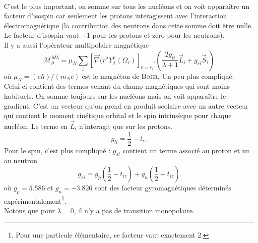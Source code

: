 \ \\

C'est le plus important, on somme sur tous les nucléons et on voit apparaître un facteur d'isospin car 
seulement les protons interagissent avec l'interaction électromagnétique (la contribution des neutrons dans
cette somme doit être nulle. Le facteur d'isospin vaut +1 pour les protons et zéro pour les neutrons).\ \\

Il y a aussi l'opérateur multipolaire magnétique
\begin{equation}
\mathcal{M}_\mu^{M\lambda} = \mu_N\sum_i[\vec\nabla(r^\lambda Y_\lambda^\mu(\Omega_r)]_{r=r_i}.\left(
\frac{2g_{li}}{\lambda+1}\vec{L}_i+g_{si}\vec{S}_i\right)
\end{equation}
où $\mu_N = (e\hbar)/(m_Nc)$ est le magnéton de \textsc{Bohr}. Un peu plus compliqué. Celui-ci contient des termes
venant du champ magnétiques qui sont moins habituels. On somme toujours sur les nucléons mais on voit apparaître le
gradient. C'est un vecteur qu'on prend en produit scolaire avec un autre vecteur qui contient le moment cinétique
orbital et le spin intrinsèque pour chaque nucléon. Le terme en $\vec L_i$ n'interagit que sur les protons. 
\begin{equation}
g_{li} = \frac{1}{2}-t_{iz}
\end{equation}
Pour le spin, c'est plus compliqué : $g_{si}$ contient un terme associé au proton et un au neutron
\begin{equation}
g_{si} = g_p\left(\frac{1}{2}-t_{iz}\right)+g_n\left(\frac{1}{2}+t_{iz}\right)
\end{equation}
où $g_p=5.586$ et $g_n=-3.826$ sont des facteur gyromagnétiques déterminés expérimentalement\footnote{Pour une
particule élémentaire, ce facteur vaut exactement 2.}.\\

Notons que pour $\lambda = 0$, il n'y a pas de transition monopolaire.

